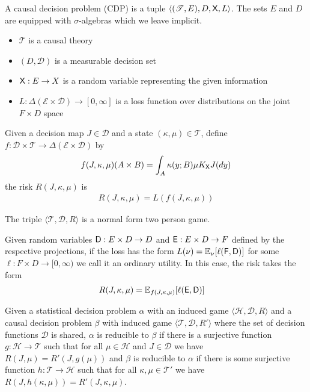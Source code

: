 \begin{definition}\label{def:CDP}
A causal decision problem (CDP) is a tuple $\langle (\mathscr{T}, E), D, \mathsf{X}, L \rangle$. The sets $E$ and $D$ are equipped with $\sigma$-algebras which we leave implicit.

\begin{itemize}
    \item $\mathscr{T}$ is a causal theory
    \item $(D,\mathcal{D})$ is a measurable decision set
    \item $\mathsf{X}:E\to X$ is a random variable representing the given information
    \item $L:\Delta(\mathcal{E}\times\mathcal{D})\to [0,\infty]$ is a loss function over distributions on the joint $F\times D$ space
\end{itemize}

Given a decision map $J\in\mathscr{D}$ and a state $(\kappa,\mu)\in \mathscr{T}$, define $f:\mathscr{D}\times\mathscr{T}\to\Delta(\mathcal{E}\times\mathcal{D})$ by
\begin{align}
    f(J,\kappa,\mu)(A\times B) = \int_A \kappa (y;B) \mu K_{\mathsf{X}} J(dy)
\end{align}
the risk $R(J,\kappa,\mu)$ is
\begin{align}
    R(J,\kappa,\mu) = L(f(J,\kappa,\mu)) 
\end{align}

The triple $\langle \mathscr{T}, \mathscr{D}, R\rangle$ is a normal form two person game.

Given random variables $\mathsf{D}:E\times D\to D$ and $\mathsf{E}:E\times D\to F$ defined by the respective projections, if the loss has the form $L(\nu) = \mathbb{E}_{\nu}[\ell(\mathsf{F},\mathsf{D})]$ for some $\ell:F\times D\to [0,\infty)$ we call it an ordinary utility. In this case, the risk takes the form
\begin{align}
    R(J,\kappa,\mu) &= \mathbb{E}_{f(J,\kappa,\mu)}[\ell(\mathsf{E},\mathsf{D})]
\end{align}


\end{definition}

\begin{definition}
Given a statistical decision problem $\alpha$ with an induced game $\langle \mathscr{H}, \mathscr{D}, R\rangle$ and a causal decision problem $\beta$ with induced game $\langle \mathscr{T}, \mathscr{D}, R'\rangle$ where the set of decision functions $\mathscr{D}$ is shared, $\alpha$ is reducible to $\beta$ if there is a surjective function $g:\mathscr{H}\to \mathscr{T}$ such that for all $\mu\in \mathscr{H}$ and $J\in \mathscr{D}$ we have $R(J,\mu)=R'(J,g(\mu))$ and $\beta$ is reducible to $\alpha$ if there is some surjective function $h:\mathscr{T}\to \mathscr{H}$ such that for all $\kappa,\mu\in \mathscr{T}'$ we have $R(J,h(\kappa,\mu))=R'(J,\kappa,\mu)$.
\end{definition}

